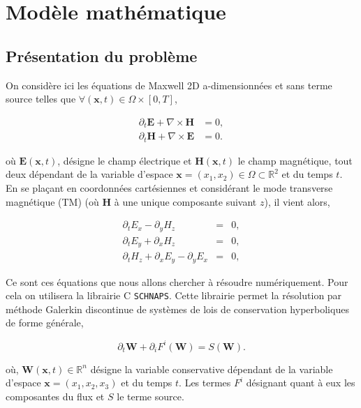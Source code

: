 \documentclass[a4paper,oneside,10pt]{report}
\begin{document}
\def\chaptername{travaux pratiques} 
 
\pagestyle{plain}


\tableofcontents

\chapter{Modèle mathématique}
\section{Présentation du problème}
On considère ici les équations de Maxwell 2D a-dimensionnées et sans terme source telles que $\forall (\mathbf{x},t) \in \Omega \times [0,T]$,


\begin{equation}
\begin{aligned}
\label{eq:1}
\partial_t \mathbf{E} + \nabla \times \mathbf{H} &= 0,\\
\partial_t \mathbf{H} + \nabla \times \mathbf{E} &= 0.
\end{aligned}
\end{equation}

où $\mathbf{E}(\mathbf{x},t)$, désigne le champ électrique et $\mathbf{H}(\mathbf{x},t)$ le champ magnétique, tout deux dépendant de la variable d'espace $\mathbf{x}=(x_1,x_2)\in \Omega \subset \mathbb{R}^2$ et du temps $t$. En se plaçant en coordonnées cartésiennes et considérant le mode transverse magnétique (TM) (où $\mathbf{H}$ à une unique composante suivant $z$), il vient alors,

\begin{eqnarray}
\partial_t E_x - \partial_y H_z  &=& 0, \label{eq:2a}\\
\partial_t E_y + \partial_x H_z &=& 0, \label{eq:2b}\\
\partial_t H_z + \partial_x E_y - \partial_y E_x &=& 0, \label{eq:2c}
\end{eqnarray}


Ce sont ces équations que nous allons chercher à résoudre numériquement. Pour cela on utilisera la librairie C \texttt{SCHNAPS}. Cette librairie permet la résolution par méthode Galerkin discontinue de systèmes de lois de conservation hyperboliques de forme générale,

\begin{equation}
\label{eq:sysh}
\partial_t \mathbf{W} +  \partial_i F^i(\mathbf{W}) = S(\mathbf{W}).
\end{equation}

où, $\mathbf{W}(\mathbf{x},t) \in \mathbb{R}^n$ désigne la variable conservative dépendant de la variable d'espace $\mathbf{x} = (x_1,x_2,x_3)$ et du temps $t$. Les termes $F^i$ désignant quant à eux les composantes du flux et $S$ le terme source.\newline
\end{document}
